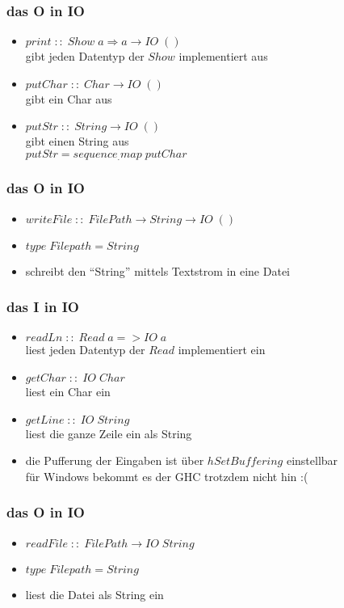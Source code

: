 \begin{frame}
\frametitle{das O in IO}
\begin{itemize}
  \item $print \;::\; Show\; a \Rightarrow a \to IO\;()$ \\ gibt jeden Datentyp der $Show$ implementiert aus
  \item $putChar\; :: \; Char \to IO \;()$ \\ gibt ein Char aus
  \item $putStr\; :: \; String \to IO\;()$\\ gibt einen String aus \\
  $putStr = sequence_.map\; putChar$
\end{itemize}
\end{frame}

\begin{frame}
\frametitle{das O in IO}
\begin{itemize}
  \item $writeFile \;::\; FilePath \to String \to IO\;()$ 
  \item $type \; Filepath = String$
  \item schreibt den "`String"' mittels Textstrom in eine Datei
\end{itemize}
\end{frame}

\begin{frame}
\frametitle{das I in IO}
\begin{itemize}
  \item $readLn\; ::\; Read \;a => IO \;a$ \\liest jeden Datentyp der $Read$ implementiert ein
  \item $getChar \; :: \; IO \;Char$ \\ liest ein Char ein
  \item $getLine \; :: \; IO \;String$\\ liest die ganze Zeile ein als String
  \item die Pufferung der Eingaben ist über $hSetBuffering$ einstellbar\\ für Windows bekommt es der GHC trotzdem nicht hin :(
\end{itemize}
\end{frame}

\begin{frame}
\frametitle{das O in IO}
\begin{itemize}
  \item $readFile \;:: \;FilePath \to IO\;String$ 
  \item $type \; Filepath = String$
  \item liest die Datei als String ein
\end{itemize}
\end{frame}

